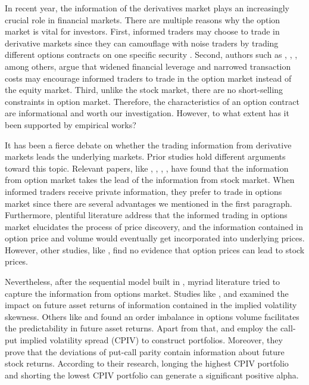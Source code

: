 
In recent year, the information of the derivatives market plays an increasingly crucial role in financial markets. There are multiple reasons why the option market is vital for investors. First, informed traders may choose to trade in derivative markets since they can camouflage with noise traders by trading different options contracts on one specific security \parencite{easley1998option}. Second, authors such as \textcite{black1973pricing}, \textcite{mayhew1995allocation}, \textcite{fleming1996trading}, among others, argue that widened financial leverage and narrowed transaction costs may encourage informed traders to trade in the option market instead of the equity market. Third, unlike the stock market, there are no short-selling constraints in option market. Therefore, the characteristics of an option contract are informational and worth our investigation. However, to what extent has it been supported by empirical works? 

It has been a fierce debate on whether the trading information from derivative markets leads the underlying markets. Prior studies hold different arguments toward this topic. Relevant papers, like \textcite{manaster1982option}, \textcite{anthony1988interrelation}, \textcite{chakravarty2004informed}, \textcite{cremers2010deviations}, \textcite{xing2010does} have found that the information from option market takes the lead of the information from stock market. When informed traders receive private information, they prefer to trade in options market since there are several advantages we mentioned in the first paragraph. Furthermore, plentiful literature address that the informed trading in options market elucidates the process of price discovery, and the information contained in option price and volume would eventually get incorporated into underlying prices. However, other studies, like \textcite{chan1993option}, \textcite{stephan1990intraday} find no evidence that option prices can lead to stock prices. 

Nevertheless, after the sequential model built in \textcite{easley1998option}, myriad literature tried to capture the information from options market. Studies like \textcite{doran2007there}, \textcite{doran2010implications} and \textcite{atilgan2015implied} examined the impact on future asset returns of information contained in the implied volatility skewness. Others like \textcite{chan2002informational} and \textcite{pan2006information} found an order imbalance in options volume facilitates the predictability in future asset returns. Apart from that, \textcite{bali2009volatility} and \textcite{cremers2010deviations} employ the call-put implied volatility spread (CPIV) to construct portfolios. Moreover, they prove that the deviations of put-call parity contain information about future stock returns. According to their research, longing the highest CPIV portfolio and shorting the lowest CPIV portfolio can generate a significant positive alpha.   

